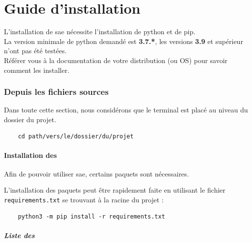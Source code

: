 \part{Guide d'installation}

L'installation de \gls{sae} nécessite l'installation de \gls{python} et de \gls{pip}.\\
La version minimale de \gls{python} demandé est \textbf{3.7.*}, les versions \textbf{3.9} et supérieur n'ont pas été
testées.\\
Référer vous à la documentation de votre distribution (ou OS) pour savoir comment les installer.

\section{Depuis les fichiers sources}

Dans toute cette section, nous considérons que le terminal est placé au niveau du dossier du projet.

\begin{verbatim}
    cd path/vers/le/dossier/du/projet
\end{verbatim}

\subsection{Installation des }

Afin de pouvoir utiliser \gls{sae}, certains \glspl{paquet} sont nécessaires.\newline

L'installation des \glspl{paquet} peut être rapidement faite en utilisant le fichier \verb=requirements.txt= se
trouvant à la racine du projet :

\begin{verbatim}
    python3 -m pip install -r requirements.txt
\end{verbatim}

\subsubsection{Liste des }

